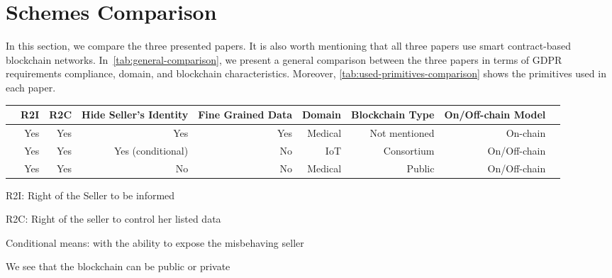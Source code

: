 \section{Schemes Comparison}
\label{sec:schemes-comparison}

In this section, we compare the three presented papers.
It is also worth mentioning that all three papers use smart contract-based blockchain networks.
In~\cref{tab:general-comparison}, we present a general comparison between 
the three papers in terms of GDPR requirements compliance, domain, and blockchain characteristics.
Moreover, \cref{tab:used-primitives-comparison} shows the primitives used in each paper.

\begin{table*}[h!]\centering
\caption{General schemes comparison}\label{tab:general-comparison}
\scriptsize
\begin{threeparttable}
\begin{tabular}{lrrrrrrrr}\toprule
&R2I\tnote{1} &R2C\tnote{2} &Hide Seller's Identity &Fine Grained Data &Domain &Blockchain Type &On/Off-chain Model \\\midrule
\cite{xue2023blockchain} &Yes &Yes &Yes &Yes &Medical &Not mentioned\tnote{4} &On-chain \\
\cite{liu2022blockchain} &Yes &Yes &Yes (conditional)\tnote{3} &No &IoT &Consortium &On/Off-chain \\
\cite{alsharif2020blockchain} &Yes &Yes &No &No &Medical &Public &On/Off-chain \\
\bottomrule
\end{tabular}
\begin{tablenotes}
    \item[1] R2I: Right of the Seller to be informed
    \item[2] R2C: Right of the seller to control her listed data
    \item[3] Conditional means: with the ability to expose the misbehaving seller
    \item[4] We see that the blockchain can be public or private
\end{tablenotes}
\end{threeparttable}
\end{table*}

